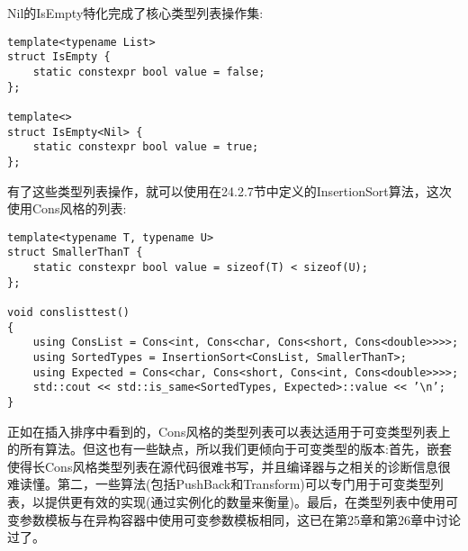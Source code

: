 Nil的IsEmpty特化完成了核心类型列表操作集:

\begin{lstlisting}[style=styleCXX]
template<typename List>
struct IsEmpty {
	static constexpr bool value = false;
};

template<>
struct IsEmpty<Nil> {
	static constexpr bool value = true;
};
\end{lstlisting}

有了这些类型列表操作，就可以使用在24.2.7节中定义的InsertionSort算法，这次使用Cons风格的列表:

\begin{lstlisting}[style=styleCXX]
template<typename T, typename U>
struct SmallerThanT {
	static constexpr bool value = sizeof(T) < sizeof(U);
};

void conslisttest()
{
	using ConsList = Cons<int, Cons<char, Cons<short, Cons<double>>>>;
	using SortedTypes = InsertionSort<ConsList, SmallerThanT>;
	using Expected = Cons<char, Cons<short, Cons<int, Cons<double>>>>;
	std::cout << std::is_same<SortedTypes, Expected>::value << ’\n’;
}
\end{lstlisting}

正如在插入排序中看到的，Cons风格的类型列表可以表达适用于可变类型列表上的所有算法。但这也有一些缺点，所以我们更倾向于可变类型的版本:首先，嵌套使得长Cons风格类型列表在源代码很难书写，并且编译器与之相关的诊断信息很难读懂。第二，一些算法(包括PushBack和Transform)可以专门用于可变类型列表，以提供更有效的实现(通过实例化的数量来衡量)。最后，在类型列表中使用可变参数模板与在异构容器中使用可变参数模板相同，这已在第25章和第26章中讨论过了。





















